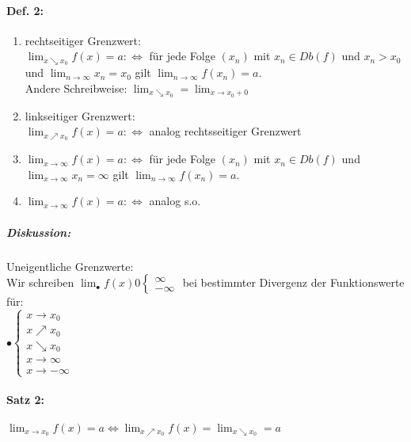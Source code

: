 \paragraph{Def. 2:} 
\begin{enumerate}[label = \alph*.)]
\item rechtseitiger Grenzwert:\\
$\lim_{x\searrow x_0} f(x)=a : \Leftrightarrow $ für jede Folge $(x_n)$ mit $x_n \in Db(f)$ und $x_n > x_0$ und $\lim_{n\to \infty} x_n =x_0$ gilt $\lim_{n\to \infty} f(x_n)=a$.\\
Andere Schreibweise: $\lim_{x\searrow x_0}=\lim_{x\to x_0+0}$
\item linkseitiger Grenzwert:\\
$\lim_{x\nearrow x_0} f(x) =a :\Leftrightarrow$ analog rechtsseitiger Grenzwert
\item $\lim_{x\to \infty} f(x) = a :\Leftrightarrow$ für jede Folge $(x_n)$ mit $x_n \in Db(f)$ und $\lim_{x\to \infty} x_n = \infty$ gilt $\lim_{n\to \infty} f(x_n)=a$.
\item $\lim_{x\to \infty} f(x) =a :\Leftrightarrow$ analog s.o.
\end{enumerate}
\subparagraph{Diskussion:} Uneigentliche Grenzwerte:\\
Wir schreiben 
 $\lim_{\bullet} f(x) 0 \begin{cases}
 \infty\\
 -\infty
 \end{cases}$  bei bestimmter Divergenz der Funktionswerte für:\\
$\bullet \begin{cases}
x \to x_0\\
x \nearrow x_0\\
x \searrow x_0\\
x\to \infty\\
x\to -\infty
\end{cases}$

\paragraph{Satz 2:}\parskp
$\lim_{x\to x_0} f(x) =a \Leftrightarrow \lim_{x\nearrow x_0} f(x)=\lim_{x\searrow x_0}=a$

